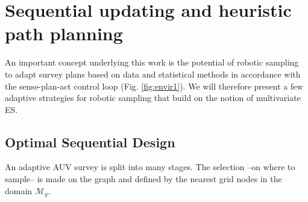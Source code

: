 \documentclass[aoas]{imsart}
\begin{document}





\section{Sequential updating and heuristic path planning}\label{sec:heuristics}

An important concept underlying this work is the potential of robotic
sampling to adapt survey plans based on data and statistical methods
in accordance with the sense-plan-act control loop (Fig. \ref{fig:envir1}). We
will therefore present a few adaptive strategies for robotic sampling
that build on the notion of multivariate ES.

\subsection{Optimal Sequential Design}
\label{Optdes}

An adaptive AUV survey is split into many stages. The selection --on where to sample-- is made on the graph and defined by the nearest grid nodes in the domain $\mathcal{M}_g$.
\end{document}
